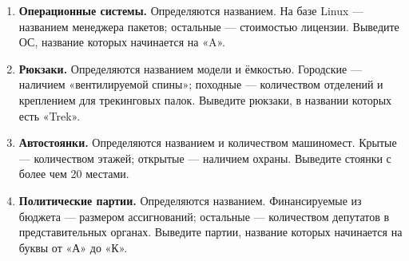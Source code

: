 \begin{enumerate}
    \item \textbf{Операционные системы.}  
    Определяются названием. На базе Linux — названием менеджера пакетов; остальные — стоимостью лицензии.  
    Выведите ОС, название которых начинается на «A».

    \item \textbf{Рюкзаки.}  
    Определяются названием модели и ёмкостью. Городские — наличием «вентилируемой спины»; походные — количеством отделений и креплением для трекинговых палок.  
    Выведите рюкзаки, в названии которых есть «Trek».

    \item \textbf{Автостоянки.}  
    Определяются названием и количеством машиномест. Крытые — количеством этажей; открытые — наличием охраны.  
    Выведите стоянки с более чем 20 местами.

    \item \textbf{Политические партии.}  
    Определяются названием. Финансируемые из бюджета — размером ассигнований; остальные — количеством депутатов в представительных органах.  
    Выведите партии, название которых начинается на буквы от «А» до «К».
\end{enumerate}
